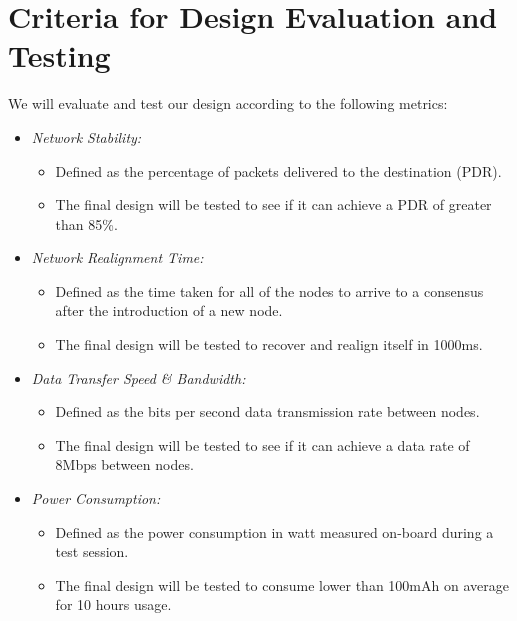 \section{Criteria for Design Evaluation and Testing}
We will evaluate and test our design according to the following metrics:

\begin{itemize}
    \item \textit{Network Stability:}
    \begin{itemize}
        \item Defined as the percentage of packets delivered to the destination (PDR).
        \item The final design will be tested to see if it can achieve a PDR of greater than 85\%.
    \end{itemize}
    
    \item \textit{Network Realignment Time:}
    \begin{itemize}
        \item Defined as the time taken for all of the nodes to arrive to a consensus after the introduction of a new node. 
        \item The final design will be tested to recover and realign itself in 1000\si{ms}.
    \end{itemize}
    
    \item \textit{Data Transfer Speed \& Bandwidth:}
    \begin{itemize}
        \item Defined as the bits per second data transmission rate between nodes.
        \item The final design will be tested to see if it can achieve a data rate of 8\si{Mbps} between nodes.
    \end{itemize}
    
    \item \textit{Power Consumption:}
    \begin{itemize}
        \item Defined as the power consumption in watt measured on-board during a test session. 
        \item The final design will be tested to consume lower than 100\si{mAh} on average for 10 hours usage.
    \end{itemize}
    

\end{itemize}
